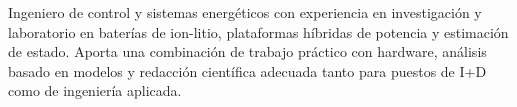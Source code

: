 
\begin{cvparagraph}

Ingeniero de control y sistemas energ\'eticos con experiencia en investigaci\'on y laboratorio en bater\'ias de ion-litio, plataformas h\'ibridas de potencia y estimaci\'on de estado. Aporta una combinaci\'on de trabajo pr\'actico con hardware, an\'alisis basado en modelos y redacci\'on cient\'ifica adecuada tanto para puestos de I+D como de ingenier\'ia aplicada.

\end{cvparagraph}

